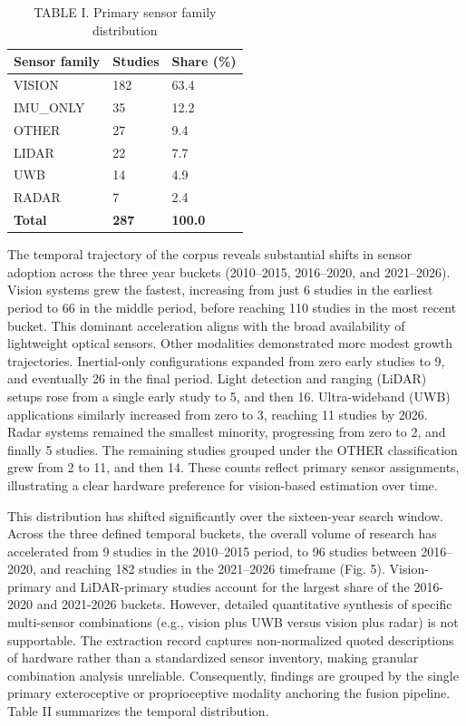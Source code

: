 \documentclass[conference]{IEEEtran}
\begin{document}
\begin{table}[htbp]
\centering
\caption{TABLE I. Primary sensor family distribution}
\label{tab:1}
\begin{tabular}{l l l}
\hline
Sensor family & Studies & Share (\%) \\
\hline
VISION & 182 & 63.4 \\
\hline
IMU\_ONLY & 35 & 12.2 \\
\hline
OTHER & 27 & 9.4 \\
\hline
LIDAR & 22 & 7.7 \\
\hline
UWB & 14 & 4.9 \\
\hline
RADAR & 7 & 2.4 \\
\hline
\textbf{Total} & \textbf{287} & \textbf{100.0} \\
\hline
\end{tabular}
\end{table}



The temporal trajectory of the corpus reveals substantial shifts in sensor adoption across the three year buckets (2010–2015, 2016–2020, and 2021–2026). Vision systems grew the fastest, increasing from just 6 studies in the earliest period to 66 in the middle period, before reaching 110 studies in the most recent bucket. This dominant acceleration aligns with the broad availability of lightweight optical sensors. Other modalities demonstrated more modest growth trajectories. Inertial-only configurations expanded from zero early studies to 9, and eventually 26 in the final period. Light detection and ranging (LiDAR) setups rose from a single early study to 5, and then 16. Ultra-wideband (UWB) applications similarly increased from zero to 3, reaching 11 studies by 2026. Radar systems remained the smallest minority, progressing from zero to 2, and finally 5 studies. The remaining studies grouped under the OTHER classification grew from 2 to 11, and then 14. These counts reflect primary sensor assignments, illustrating a clear hardware preference for vision-based estimation over time.


This distribution has shifted significantly over the sixteen-year search window. Across the three defined temporal buckets, the overall volume of research has accelerated from 9 studies in the 2010–2015 period, to 96 studies between 2016–2020, and reaching 182 studies in the 2021–2026 timeframe (Fig. 5). Vision-primary and LiDAR-primary studies account for the largest share of the 2016-2020 and 2021-2026 buckets. However, detailed quantitative synthesis of specific multi-sensor combinations (e.g., vision plus UWB versus vision plus radar) is not supportable. The extraction record captures non-normalized quoted descriptions of hardware rather than a standardized sensor inventory, making granular combination analysis unreliable. Consequently, findings are grouped by the single primary exteroceptive or proprioceptive modality anchoring the fusion pipeline. Table II summarizes the temporal distribution.
\end{document}
